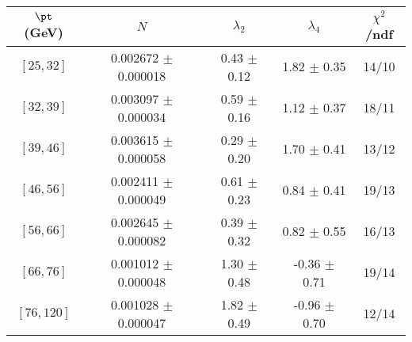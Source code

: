 \begin{tabular}{c||c|c|c|c}
$\pt$ (GeV) & $N$ & $\lambda_{2}$ & $\lambda_4$  & $\chi^2$/ndf  \\
\hline
$[25, 32]$ & 0.002672 $\pm$ 0.000018 & 0.43 $\pm$ 0.12 & 1.82 $\pm$ 0.35 & 14/10\\
$[32, 39]$ & 0.003097 $\pm$ 0.000034 & 0.59 $\pm$ 0.16 & 1.12 $\pm$ 0.37 & 18/11\\
$[39, 46]$ & 0.003615 $\pm$ 0.000058 & 0.29 $\pm$ 0.20 & 1.70 $\pm$ 0.41 & 13/12\\
$[46, 56]$ & 0.002411 $\pm$ 0.000049 & 0.61 $\pm$ 0.23 & 0.84 $\pm$ 0.41 & 19/13\\
$[56, 66]$ & 0.002645 $\pm$ 0.000082 & 0.39 $\pm$ 0.32 & 0.82 $\pm$ 0.55 & 16/13\\
$[66, 76]$ & 0.001012 $\pm$ 0.000048 & 1.30 $\pm$ 0.48 & -0.36 $\pm$ 0.71 & 19/14\\
$[76, 120]$ & 0.001028 $\pm$ 0.000047 & 1.82 $\pm$ 0.49 & -0.96 $\pm$ 0.70 & 12/14\\
\end{tabular}
